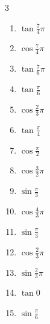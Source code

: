 \begin{multicols}{3}
\begin{enumerate}
  \item $\displaystyle \tan{\frac{7}{4}\pi}$
        \phantom{$\displaystyle =-1$}

  \item $\displaystyle \cos{\frac{7}{4}\pi}$

  \item $\displaystyle \tan{\frac{7}{6}\pi}$

  \item $\displaystyle \tan{\frac{\pi}{6}}$

  \item $\displaystyle \cos{\frac{2}{3}\pi}$

  \item $\displaystyle \tan{\frac{\pi}{4}}$
        \phantom{$\displaystyle =1$}

  \item $\displaystyle \cos{\frac{\pi}{2}}$
        \phantom{$\displaystyle =0$}

  \item $\displaystyle \cos{\frac{3}{2}\pi}$
        \phantom{$\displaystyle =0$}

  \item $\displaystyle \sin{\frac{\pi}{3}}$

  \item $\displaystyle \cos{\frac{4}{3}\pi}$

\columnbreak %

  \item $\displaystyle \sin{\frac{\pi}{3}}$

  \item $\displaystyle \cos{\frac{2}{3}\pi}$

  \item $\displaystyle \sin{\frac{2}{3}\pi}$

  \item $\displaystyle \tan{0}$
        \phantom{$\displaystyle =0$}

  \item $\displaystyle \sin{\frac{\pi}{6}}$


\end{enumerate}
\end{multicols}
